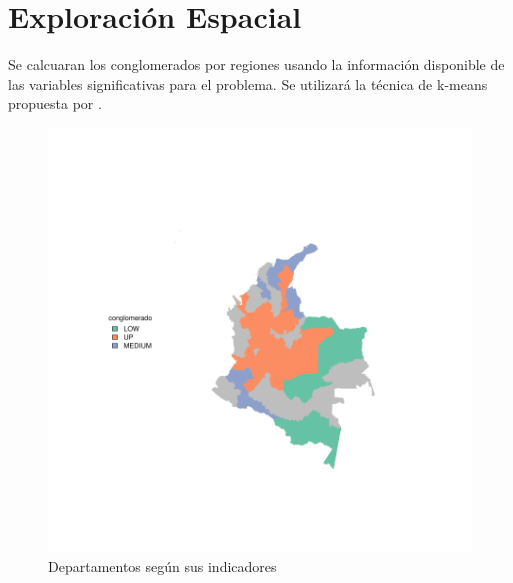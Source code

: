 \documentclass{article}
\begin{document}
\section{Exploración Espacial}\label{exploracion}

Se calcuaran los conglomerados por regiones usando la información disponible de las variables significativas para el problema. Se utilizará la técnica de k-means propuesta por \cite{macqueen_methods_nodate}.




\begin{figure}[h]
\centering
\begin{adjustbox}{width=12cm,height=12cm,clip,trim=0cm 0cm 0cm 0cm}
\includegraphics{ProyectoFinal-plotMap1}
\end{adjustbox}
\caption{Departamentos según sus indicadores}\label{clustmap}
\end{figure}




\end{document}
